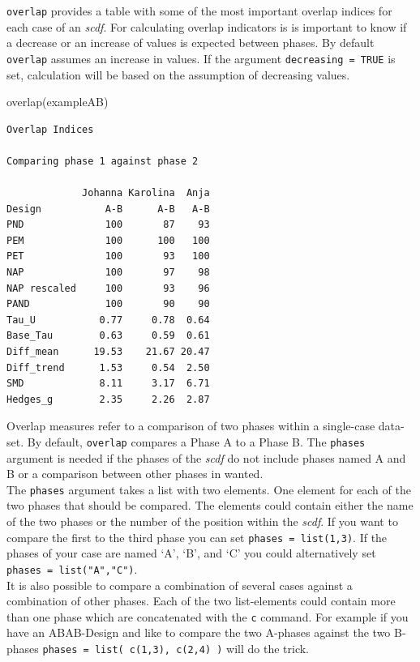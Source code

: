 \documentclass[
]{book}
\newenvironment{Shaded}{\begin{snugshade}}{\end{snugshade}}
\newcommand{\FunctionTok}[1]{\textcolor[rgb]{0.00,0.00,0.00}{#1}}
\newcommand{\NormalTok}[1]{#1}
\begin{document}
\texttt{overlap} provides a table with some of the most important overlap indices for each case of an \emph{scdf}. For calculating overlap indicators is is important to know if a decrease or an increase of values is expected between phases. By default \texttt{overlap} assumes an increase in values. If the argument \texttt{decreasing\ =\ TRUE} is set, calculation will be based on the assumption of decreasing values.

\begin{Shaded}
\begin{Highlighting}[]
\FunctionTok{overlap}\NormalTok{(exampleAB)}
\end{Highlighting}
\end{Shaded}

\begin{verbatim}
Overlap Indices

Comparing phase 1 against phase 2 

             Johanna Karolina  Anja
Design           A-B      A-B   A-B
PND              100       87    93
PEM              100      100   100
PET              100       93   100
NAP              100       97    98
NAP rescaled     100       93    96
PAND             100       90    90
Tau_U           0.77     0.78  0.64
Base_Tau        0.63     0.59  0.61
Diff_mean      19.53    21.67 20.47
Diff_trend      1.53     0.54  2.50
SMD             8.11     3.17  6.71
Hedges_g        2.35     2.26  2.87
\end{verbatim}

Overlap measures refer to a comparison of two phases within a single-case data-set. By default, \texttt{overlap} compares a Phase A to a Phase B. The \texttt{phases} argument is needed if the phases of the \emph{scdf} do not include phases named A and B or a comparison between other phases in wanted.\\
The \texttt{phases} argument takes a list with two elements. One element for each of the two phases that should be compared. The elements could contain either the name of the two phases or the number of the position within the \emph{scdf}. If you want to compare the first to the third phase you can set \texttt{phases\ =\ list(1,3)}. If the phases of your case are named `A', `B', and `C' you could alternatively set \texttt{phases\ =\ list("A","C")}.\\
It is also possible to compare a combination of several cases against a combination of other phases. Each of the two list-elements could contain more than one phase which are concatenated with the \texttt{c} command. For example if you have an ABAB-Design and like to compare the two A-phases against the two B-phases \texttt{phases\ =\ list(\ c(1,3),\ c(2,4)\ )} will do the trick.
\end{document}
